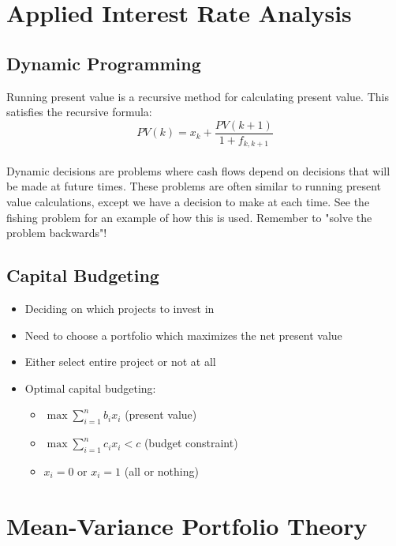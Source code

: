 \documentclass[11pt]{article}
\begin{document}
\section{Applied Interest Rate Analysis}

\subsection{Dynamic Programming}
Running present value is a recursive method for calculating present value.  This satisfies the recursive formula: \\  $$ PV(k) = x_k + \frac{PV(k+1)}{1+f_{k,k+1}}$$ \\
Dynamic decisions are problems where cash flows depend on decisions that will be made at future times. These problems are often similar to running present value calculations, except we have a decision to make at each time.  See the fishing problem for an example of how this is used.  Remember to "solve the problem backwards"!

\subsection{Capital Budgeting}
\begin{itemize}
\item Deciding on which projects to invest in 
\item Need to choose a portfolio which maximizes the net present value
\item Either select entire project or not at all
\item Optimal capital budgeting: 
\begin{itemize}
\item $ \max \sum_{i=1}^n b_ix_i $ (present value)
\item $ \max \sum_{i=1}^n c_ix_i < c$ (budget constraint)
\item $x_i = 0$ or $x_i = 1$ (all or nothing)
\end{itemize}
\end{itemize}
\pagebreak

\section{Mean-Variance Portfolio Theory}
\end{document}

